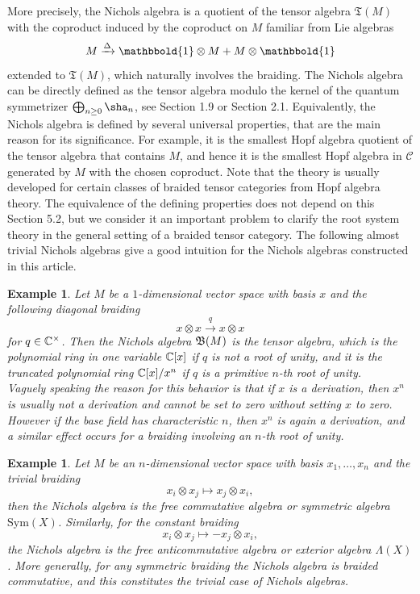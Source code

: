 \documentclass[a4paper, reqno]{amsart}
\newtheorem{example}[theorem]{Example}
\theoremstyle{introTheorems}
\newcommand\cC{\mathcal{C}}
\renewcommand{\1}{\mathbbold{1}}
\begin{document}
More precisely, the Nichols algebra is a quotient of the tensor algebra $\mathfrak{T}(M)$ with the coproduct induced by the coproduct on $M$ familiar from Lie algebras 
$$M\xrightarrow{\Delta} \1\otimes M + M\otimes \1$$
extended to $\mathfrak{T}(M)$, which naturally involves the braiding. The Nichols algebra can be directly defined as the tensor algebra modulo the kernel of the quantum symmetrizer $\bigoplus_{n\geq 0}\sha_n$, see \cite{HS20} Section 1.9 or \cite{Len26} Section 2.1. Equivalently, the Nichols algebra is defined by several universal properties, that are the main reason for its significance. For example, it is the smallest Hopf algebra quotient of the tensor algebra that contains $M$, and hence it is the smallest Hopf algebra in $\cC$ generated by $M$ with the chosen coproduct. Note that the theory is usually developed for certain classes of braided tensor categories from Hopf algebra theory. The equivalence of the defining properties does not depend on this \cite{CLR23} Section 5.2, but we consider it an important problem to clarify the root system theory in the general setting of a braided tensor category. The following almost trivial Nichols algebras give a good intuition for the Nichols algebras constructed in this article.

\begin{example}\label{exm:NicholsTruncated}
Let $M$ be a $1$-dimensional vector space with basis $x$ and the following diagonal braiding
$$x\otimes x\xrightarrow{q} x\otimes x$$
for $q\in\mathbb{C}^\times$. Then the Nichols algebra $\mathfrak{B}(M)$ is the tensor algebra, which is the polynomial ring in one variable $\mathbb{C}[x]$ if $q$ is not a root of unity, and it is the truncated polynomial ring $\mathbb{C}[x]/x^n$ if $q$ is a primitive $n$-th root of unity.\\

Vaguely speaking  the reason for this behavior is that if $x$ is a derivation, then $x^n$ is usually not a derivation and cannot be set to zero without setting $x$ to zero. However if the base field has characteristic $n$, then $x^n$ is again a derivation, and a similar effect occurs for a braiding involving an $n$-th root of unity. 
\end{example}
\begin{example}
Let $M$ be an $n$-dimensional vector space with basis $x_1,\ldots,x_n$ and the trivial  braiding  
$$x_i\otimes x_j\mapsto x_j\otimes x_i,$$
then the Nichols algebra is the free commutative algebra or symmetric algebra $\mathrm{Sym}(X)$. Similarly, for the constant braiding
$$x_i\otimes x_j\mapsto -x_j\otimes x_i,$$
the Nichols algebra is the free anticommutative algebra or exterior algebra $\Lambda(X)$.
More generally, for any symmetric braiding the Nichols algebra is braided commutative, and this constitutes the trivial case of Nichols algebras. 
\end{example}
\end{document}
